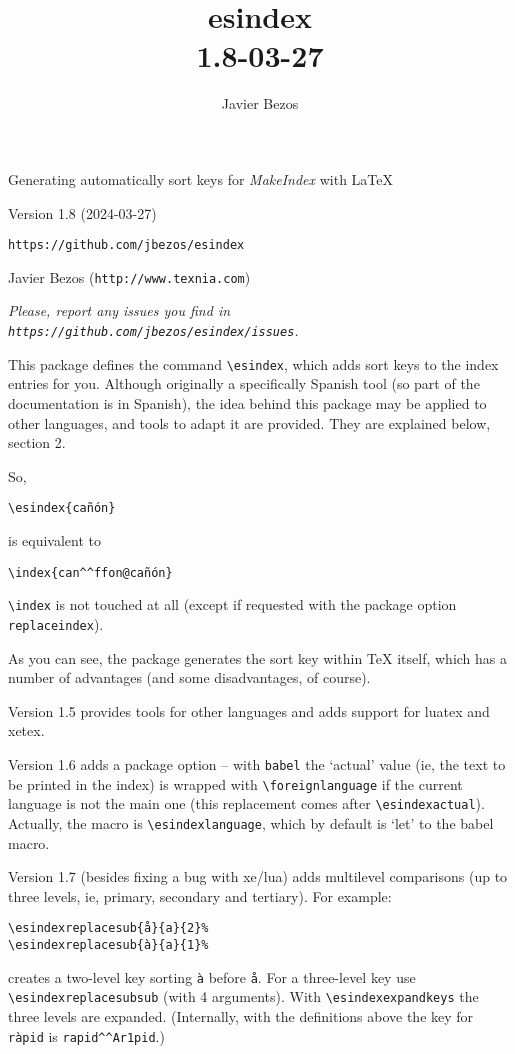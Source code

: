 \documentclass[a4paper]{ltxguide}
\title{\textsf{esindex}\\\large 1.8\quad 2024-03-27}
\author{Javier Bezos}
\begin{document}
\vspace*{1cm}
{\fontsize{48}{48}\selectfont \color{notes}{esindex}\par}
{\LARGE Generating automatically sort keys for \textit{MakeIndex}
with \LaTeX\par}
\vspace*{1ex}
Version 1.8 (2024-03-27)\par
\texttt{https://github.com/jbezos/esindex}\par
Javier Bezos (\texttt{http://www.texnia.com})

\vspace*{6ex}

{\small\itshape Please, report any issues you find in
  \texttt{https://github.com/jbezos/esindex/issues}.\par}

This package defines the command \verb|\esindex|, which adds sort keys
to the index entries for you. Although originally a specifically Spanish
tool (so part of the documentation is in Spanish), the idea behind this
package may be applied to other languages, and tools to adapt it are
provided. They are explained below, section 2.

So,
\begin{verbatim}
\esindex{cañón}
\end{verbatim}
is equivalent to
\begin{verbatim}
\index{can^^ffon@cañón}
\end{verbatim}

\verb|\index| is not touched at all (except if requested with the package
option \verb|replaceindex|).

As you can see, the package generates the sort key within \TeX{}
itself, which has a number of advantages (and some disadvantages, of
course).

Version 1.5 provides tools for other languages and adds support for
\textsf{luatex} and \textsf{xetex}.

Version 1.6 adds a package option -- with \verb|babel| the `actual' value
(ie, the text to be printed in the index) is wrapped with
\verb|\foreignlanguage| if the current language is not the main one
(this replacement comes after \verb|\esindexactual|). Actually, the
macro is \verb|\esindexlanguage|, which by default is `let' to the
\textsf{babel} macro.

Version 1.7 (besides fixing a bug with xe/lua) adds multilevel
comparisons (up to three levels, ie, primary, secondary and tertiary).
For example:
\begin{verbatim}
\esindexreplacesub{å}{a}{2}%
\esindexreplacesub{à}{a}{1}%
\end{verbatim}
creates a two-level key sorting \verb|à| before \verb|å|. For a
three-level key use \verb|\esindexreplacesubsub| (with 4 arguments). With
\verb|\esindexexpandkeys| the three levels are expanded. (Internally,
with the definitions above the key for \verb|ràpid| is
\verb|rapid^^Ar1pid|.)
\end{document}
